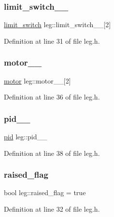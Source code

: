 \subsubsection{\texorpdfstring{limit\_switch\_\_}{limit\_switch\_\_}}
{\footnotesize\ttfamily \mbox{\hyperlink{structlimit__switch}{limit\+\_\+switch}} leg\+::limit\+\_\+switch\+\_\+\+\_\+\mbox{[}2\mbox{]}}



Definition at line 31 of file leg.\+h.

\mbox{\label{classleg_a2058f7ac334deed6758768bbe44191b8}} 
\subsubsection{\texorpdfstring{motor\_\_}{motor\_\_}}
{\footnotesize\ttfamily \mbox{\hyperlink{classmotor}{motor}} leg\+::motor\+\_\+\+\_\+\mbox{[}2\mbox{]}\hspace{0.3cm}{\ttfamily [private]}}



Definition at line 36 of file leg.\+h.

\mbox{\label{classleg_aec2df9c9b7e4952666c6a8dfc5c23fb1}} 
\subsubsection{\texorpdfstring{pid\_\_}{pid\_\_}}
{\footnotesize\ttfamily \mbox{\hyperlink{classpid}{pid}} leg\+::pid\+\_\+\+\_\+\hspace{0.3cm}{\ttfamily [private]}}



Definition at line 38 of file leg.\+h.

\mbox{\label{classleg_a372d20db7e4927fdd9f7e7a7a35120d9}} 
\subsubsection{\texorpdfstring{raised\_flag}{raised\_flag}}
{\footnotesize\ttfamily bool leg\+::raised\+\_\+flag = true}



Definition at line 32 of file leg.\+h.


